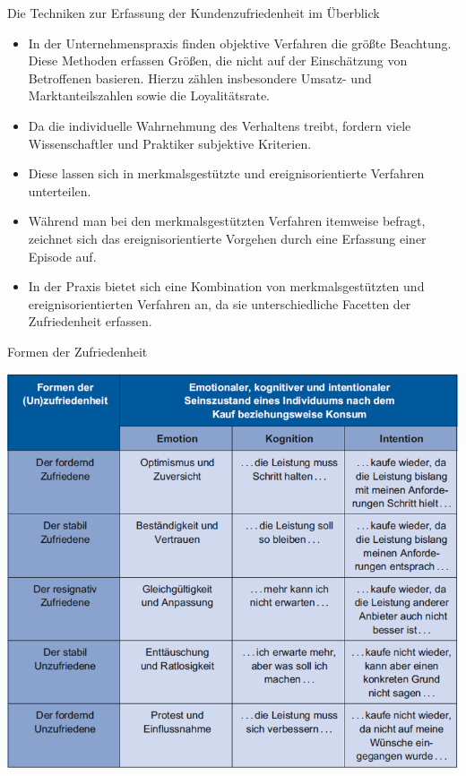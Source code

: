 \documentclass[12pt,ngerman,a4paper,ignorenonframetext,]{beamer}
\providecommand{\tightlist}{%
  \setlength{\itemsep}{0pt}\setlength{\parskip}{0pt}}
\begin{document}
\begin{frame}{Die Techniken zur Erfassung der Kundenzufriedenheit im
Überblick}
\protect\hypertarget{die-techniken-zur-erfassung-der-kundenzufriedenheit-im-uberblick}{}

\begin{itemize}
\tightlist
\item
  In der Unternehmenspraxis finden objektive Verfahren die größte
  Beachtung. Diese Methoden erfassen Größen, die nicht auf der
  Einschätzung von Betroffenen basieren. Hierzu zählen insbesondere
  Umsatz- und Marktanteilszahlen sowie die Loyalitätsrate.
\item
  Da die individuelle Wahrnehmung des Verhaltens treibt, fordern viele
  Wissenschaftler und Praktiker subjektive Kriterien.
\item
  Diese lassen sich in merkmalsgestützte und ereignisorientierte
  Verfahren unterteilen.
\item
  Während man bei den merkmalsgestützten Verfahren itemweise befragt,
  zeichnet sich das ereignisorientierte Vorgehen durch eine Erfassung
  einer Episode auf.
\item
  In der Praxis bietet sich eine Kombination von merkmalsgestützten und
  ereignisorientierten Verfahren an, da sie unterschiedliche Facetten
  der Zufriedenheit erfassen.
\end{itemize}

\end{frame}

\begin{frame}{Formen der Zufriedenheit}
\protect\hypertarget{formen-der-zufriedenheit}{}

\begin{center}\includegraphics[width=0.7\linewidth]{./images/Marketingcontrolling/Zufriedenheitsformen} \end{center}

\end{frame}
\end{document}
